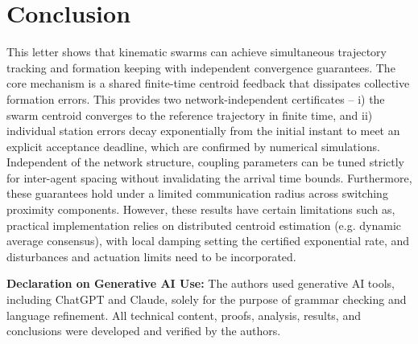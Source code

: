 \documentclass[letterpaper, 10 pt, conference]{ieeeconf}
\begin{document}
\section{Conclusion}
This letter shows that kinematic swarms can achieve simultaneous trajectory tracking and formation keeping with independent convergence guarantees. The core mechanism is a shared finite-time centroid feedback that dissipates collective formation errors. This provides two network-independent certificates -- i) the swarm centroid converges to the reference trajectory in finite time, and ii) individual station errors decay exponentially from the initial instant to meet an explicit acceptance deadline, which are confirmed by numerical simulations.  Independent of the network structure, coupling parameters can be tuned strictly for inter-agent spacing without invalidating the arrival time bounds. Furthermore, these guarantees hold under a limited communication radius across switching proximity components. %
However, these results have certain limitations such as, practical implementation relies on distributed centroid estimation (e.g. dynamic average consensus), with local damping setting the certified exponential rate, and disturbances and actuation limits need to be incorporated.

\noindent
\textbf{Declaration on Generative AI Use:} The authors used generative AI tools, including ChatGPT and Claude, solely for the purpose of grammar checking and language refinement. All technical content, proofs, analysis, results, and conclusions were developed and verified by the authors.



\end{document}
